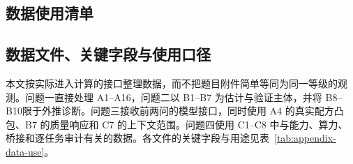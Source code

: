 \documentclass[bwprint]{gmcmthesis}
\renewcommand\thesubsection{\arabic{section}.\arabic{subsection}}
\renewcommand\thesubsubsection{\thesubsection.\arabic{subsubsection}}
\renewcommand*{\theHtable}{\arabic{section}.\arabic{table}}
\begin{document}
\clearpage
\begingroup
{}
\nocite{lu2023chatgpt,gao2026pretraining,liu2025hallucination,xie2023doremi,muennighoff2023scaling,schaeffer2023emergent,zheng2023judge,li2024datacomp,penedo2024fineweb,porian2024resolving,ruan2024observational,chiang2024arena,liu2025regmix,ye2025mixing,white2025livebench}


\endgroup

\clearpage
\begin{appendices}
    \renewcommand{\thetable}{\Alph{section}.\arabic{table}}
    \renewcommand*{\theHtable}{appendix.\Alph{section}.\arabic{table}}
    \renewcommand{\thesubsection}{\Alph{section}.\arabic{subsection}}
    \renewcommand{\thesubsubsection}{\thesubsection.\arabic{subsubsection}}

    \section{数据使用清单}

    \subsection{数据文件、关键字段与使用口径}

    本文按实际进入计算的接口整理数据，而不把题目附件简单等同为同一等级的观测。问题一直接处理 A1--A16，问题二以 B1--B7 为估计与验证主体，并将 B8--B10限于外推诊断。问题三接收前两问的模型接口，同时使用 A4 的真实配方凸包、B7 的质量响应和 C7 的上下文范围。问题四使用 C1--C8 中与能力、算力、桥接和逐任务审计有关的数据。各文件的关键字段与用途见表~\ref{tab:appendix-data-use}。


\end{appendices}
\end{document}
